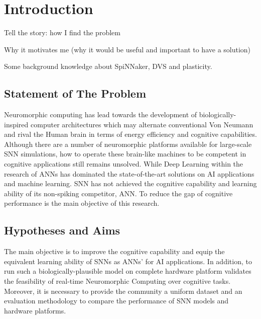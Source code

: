 \chapter{Introduction}
\label{cha:intro}

Tell the story: how I find the problem

Why it motivates me (why it would be useful and important to have a solution)

Some background knowledge about SpiNNaker, DVS and plasticity.


\section{Statement of The Problem}
\label{sec:problem}
Neuromorphic computing has lead towards the development of biologically-inspired computer architectures which may alternate conventional Von Neumann and rival the Human brain in terms of energy efficiency and cognitive capabilities.
Although there are a number of neuromorphic platforms available for large-scale SNN simulations, how to operate these brain-like machines to be competent in cognitive applications still remains unsolved.
While Deep Learning within the research of ANNs has dominated the state-of-the-art solutions on AI applications and machine learning.
SNN has not achieved the cognitive capability and learning ability of its non-spiking competitor, ANN.
To reduce the gap of cognitive performance is the main objective of this research.


\section{Hypotheses and Aims}
\label{sec:aim}
The main objective is to improve the cognitive capability and equip the equivalent learning ability of SNNs as ANNs' for AI applications.
In addition, to run such a biologically-plausible model on complete hardware platform validates the feasibility of real-time Neuromorphic Computing over cognitive tasks.
Moreover, it is necessary to provide the community a uniform dataset and an evaluation methodology to compare the performance of SNN models and hardware platforms.

